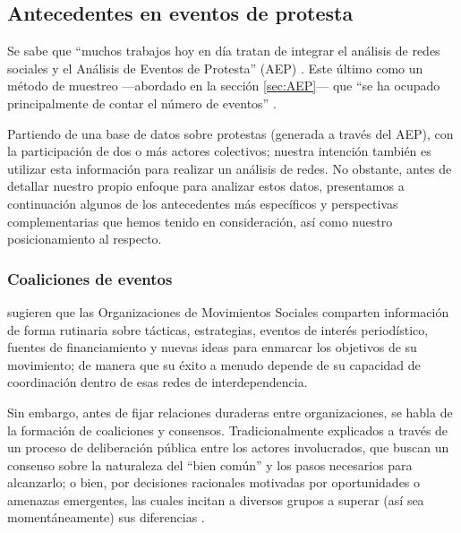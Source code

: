 \documentclass[letterpaper, 11pt]{book}
\theoremstyle{definition}
\theoremstyle{remark}
\begin{document}
\subsection{Antecedentes en eventos de protesta}
\label{sec:Redes_Protesta}


Se sabe que ``muchos trabajos hoy en día tratan de integrar el análisis de redes sociales y el Análisis de Eventos de Protesta'' (AEP) \citep[371]{2014_Caiani_SNA}. 
Este último como un método de muestreo ---abordado en la sección \ref{sec:AEP}--- que ``se ha ocupado principalmente de contar el número de eventos'' \citep[292]{2003_Wada_Tesis}. 

Partiendo de una base de datos sobre protestas (generada a través del AEP), con la participación de dos o más actores colectivos; nuestra intención también es utilizar esta información para realizar un análisis de redes. 
No obstante, antes de detallar nuestro propio enfoque para analizar estos datos, presentamos a continuación algunos de los antecedentes más específicos y perspectivas complementarias que hemos tenido en consideración, así como nuestro posicionamiento al respecto.


\subsubsection{Coaliciones de eventos}
\label{subsubsec:CoalicionesEventos}

\citet{2012_Wand_andSoule_ColabiracionOMS} sugieren que las Organizaciones de Movimientos Sociales comparten información de forma rutinaria sobre tácticas, estrategias, eventos de interés periodístico, fuentes de financiamiento y nuevas ideas para enmarcar los objetivos de su movimiento; de manera que su éxito a menudo depende de su capacidad de coordinación dentro de esas redes de interdependencia. 

Sin embargo, antes de fijar relaciones duraderas entre organizaciones, se habla de la formación de coaliciones y consensos. 
Tradicionalmente explicados a través de un proceso de deliberación pública entre los actores involucrados, que buscan un consenso sobre la naturaleza del ``bien común'' y los pasos necesarios para alcanzarlo; o bien, por decisiones racionales motivadas por oportunidades o amenazas emergentes, las cuales incitan a diversos grupos a superar (así sea momentáneamente) sus diferencias \citep[166]{2000_MischePattison_civicArena}. 
\end{document}

